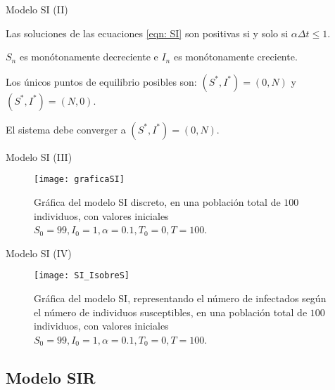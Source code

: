 \begin{frame}{Modelo SI (II)}
 
    \begin{proposition}
        Las soluciones de las ecuaciones \eqref{eqn: SI} son positivas si y solo si $\alpha\Delta t \leq 1$.
    \end{proposition}
    
    \pause

    \begin{lema}
        $S_n$ es monótonamente decreciente e $I_n$ es monótonamente creciente.
    \end{lema}

    \pause

    Los únicos puntos de equilibrio posibles son: $(S^*,I^*)=(0,N)$ y $(S^*,I^*)=(N,0)$.
    
    El sistema debe converger a $(S^*,I^*)=(0,N)$.



\end{frame}

\begin{frame}{Modelo SI (III)}
    \begin{figure}
        \begin{center}
        \caption{Gráfica del modelo SI discreto, en una población total de $100$ individuos, con valores iniciales $S_0=99, I_0 = 1, \alpha = 0.1, T_0 = 0, T = 100$.}
        \texttt{[image: graficaSI]}
        \end{center}
    \end{figure}
\end{frame}


\begin{frame}{Modelo SI (IV)}
    \begin{figure}
        \begin{center}
        \caption{Gráfica del modelo SI, representando el número de infectados según el número de individuos susceptibles, en una población total de $100$ individuos, con valores iniciales $S_0=99, I_0 = 1, \alpha = 0.1, T_0 = 0, T = 100$.}
        \label{fig: SI_IsobreS}
        \texttt{[image: SI\_IsobreS]}
        \end{center}
        \end{figure}
\end{frame}


\subsection{Modelo SIR}


